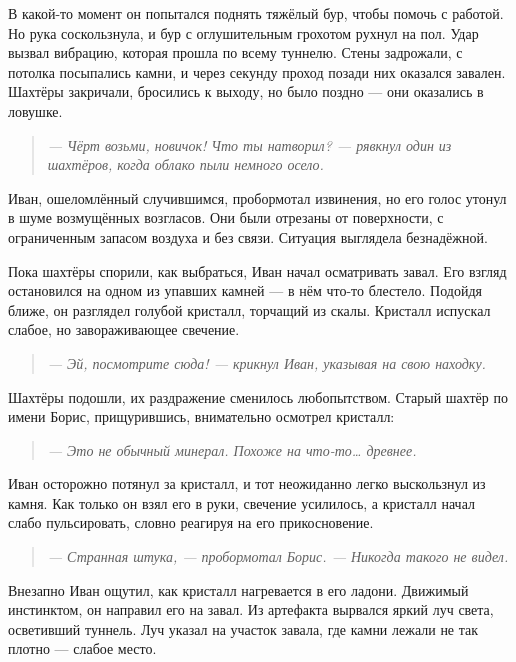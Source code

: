 \documentclass[12pt,a4paper]{book} %
\newenvironment{dialogue}{\begin{quote}\itshape}{\end{quote}}
\begin{document}
В какой-то момент он попытался поднять тяжёлый бур, чтобы помочь с работой. Но рука соскользнула, и бур с оглушительным грохотом рухнул на пол. Удар вызвал вибрацию, которая прошла по всему туннелю. Стены задрожали, с потолка посыпались камни, и через секунду проход позади них оказался завален. Шахтёры закричали, бросились к выходу, но было поздно --- они оказались в ловушке.

\begin{dialogue}
--- Чёрт возьми, новичок! Что ты натворил? --- рявкнул один из шахтёров, когда облако пыли немного осело.
\end{dialogue}

Иван, ошеломлённый случившимся, пробормотал извинения, но его голос утонул в шуме возмущённых возгласов. Они были отрезаны от поверхности, с ограниченным запасом воздуха и без связи. Ситуация выглядела безнадёжной.

Пока шахтёры спорили, как выбраться, Иван начал осматривать завал. Его взгляд остановился на одном из упавших камней --- в нём что-то блестело. Подойдя ближе, он разглядел голубой кристалл, торчащий из скалы. Кристалл испускал слабое, но завораживающее свечение.

\begin{dialogue}
--- Эй, посмотрите сюда! --- крикнул Иван, указывая на свою находку.
\end{dialogue}

Шахтёры подошли, их раздражение сменилось любопытством. Старый шахтёр по имени Борис, прищурившись, внимательно осмотрел кристалл:

\begin{dialogue}
--- Это не обычный минерал. Похоже на что-то… древнее.
\end{dialogue}

Иван осторожно потянул за кристалл, и тот неожиданно легко выскользнул из камня. Как только он взял его в руки, свечение усилилось, а кристалл начал слабо пульсировать, словно реагируя на его прикосновение.

\begin{dialogue}
--- Странная штука, --- пробормотал Борис. --- Никогда такого не видел.
\end{dialogue}

Внезапно Иван ощутил, как кристалл нагревается в его ладони. Движимый инстинктом, он направил его на завал. Из артефакта вырвался яркий луч света, осветивший туннель. Луч указал на участок завала, где камни лежали не так плотно --- слабое место.
\end{document}
